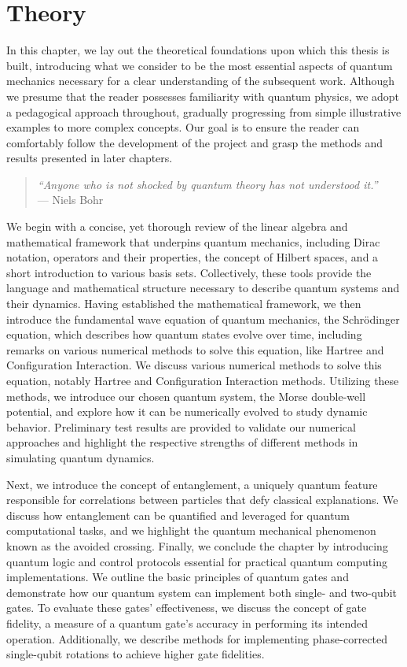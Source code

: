 \documentclass{subfiles}
\begin{document}
\chapter{Theory}
In this chapter, we lay out the theoretical foundations upon which this thesis is built, introducing what we consider to be the most essential aspects of quantum mechanics necessary for a clear understanding of the subsequent work. Although we presume that the reader possesses familiarity with quantum physics, we adopt a pedagogical approach throughout, gradually progressing from simple illustrative examples to more complex concepts. Our goal is to ensure the reader can comfortably follow the development of the project and grasp the methods and results presented in later chapters.

\begin{quote}
    \centering
    \textit{“Anyone who is not shocked by quantum theory has not understood it.”}\\
    \vspace{0.2cm}
    --- Niels Bohr
\end{quote}


We begin with a concise, yet thorough review of the linear algebra and mathematical framework that underpins quantum mechanics, including Dirac notation, operators and their properties, the concept of Hilbert spaces, and a short introduction to various basis sets. Collectively, these tools provide the language and mathematical structure necessary to describe quantum systems and their dynamics. Having established the mathematical framework, we then introduce the fundamental wave equation of quantum mechanics, the Schrödinger equation, which describes how quantum states evolve over time, including remarks on various numerical methods to solve this equation, like Hartree and Configuration Interaction. We discuss various numerical methods to solve this equation, notably Hartree and Configuration Interaction methods. Utilizing these methods, we introduce our chosen quantum system, the Morse double-well potential, and explore how it can be numerically evolved to study dynamic behavior. Preliminary test results are provided to validate our numerical approaches and highlight the respective strengths of different methods in simulating quantum dynamics.

Next, we introduce the concept of entanglement, a uniquely quantum feature responsible for correlations between particles that defy classical explanations. We discuss how entanglement can be quantified and leveraged for quantum computational tasks, and we highlight the quantum mechanical phenomenon known as the avoided crossing.
Finally, we conclude the chapter by introducing quantum logic and control protocols essential for practical quantum computing implementations. We outline the basic principles of quantum gates and demonstrate how our quantum system can implement both single- and two-qubit gates. To evaluate these gates' effectiveness, we discuss the concept of gate fidelity, a measure of a quantum gate's accuracy in performing its intended operation. Additionally, we describe methods for implementing phase-corrected single-qubit rotations to achieve higher gate fidelities.
\end{document}
